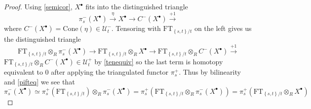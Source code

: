 \documentclass[10pt,a4paper]{amsart}
\newcommand{\Uc}{\mathcal{U}}
\newcommand{\cone}{\mathrm{Cone}}
\newcommand{\ft}{\mathrm{FT}}
\newcommand{\paren}[1]{\left( #1 \right)}
\newcommand{\set}[1]{\left \{ #1 \right \}}
\begin{document}
\begin{proof}
   Using \cref{semicor}, $X^\bullet$ fits into the distinguished triangle
   \[  \pi_s^-(X^\bullet)\xrightarrow{\eta} X^\bullet \to C^-(X^\bullet)\xrightarrow{+1}  \]
   where $C^-(X^\bullet)=\cone(\eta)\in \Uc^-_t$. Tensoring with $ \ft_{\set{s,t}/t}$ on the left gives us the distinguished triangle
   \[  \ft_{\set{s,t}/t}\otimes_R \pi_s^-(X^\bullet)\to  \ft_{\set{s,t}/t}\otimes_R X^\bullet \to  \ft_{\set{s,t}/t}\otimes_R C^-(X^\bullet)\xrightarrow{+1}  \]
  $\ft_{\set{s,t}/t}\otimes_R C^-(X^\bullet)\in \Uc_t^+$ by \cref{tenequiv} so the last term is homotopy equivalent to 0 after applying the triangulated functor $\pi_s^+$. Thus by bilinearity and \cref{pifteq} we see that
  \begin{equation}
  \label{relsereq}
  \pi_s^-(X^\bullet)\simeq \pi_s^+\paren{\ft_{\set{s,t}/t}}\otimes_R \pi_s^-(X^\bullet)= \pi_s^+\paren{\ft_{\set{s,t}/t}\otimes_R \pi_s^-(X^\bullet)}=   \pi_s^+\paren{\ft_{\set{s,t}/t}\otimes_R X^\bullet} 
  \end{equation}
\end{proof}
\end{document}
